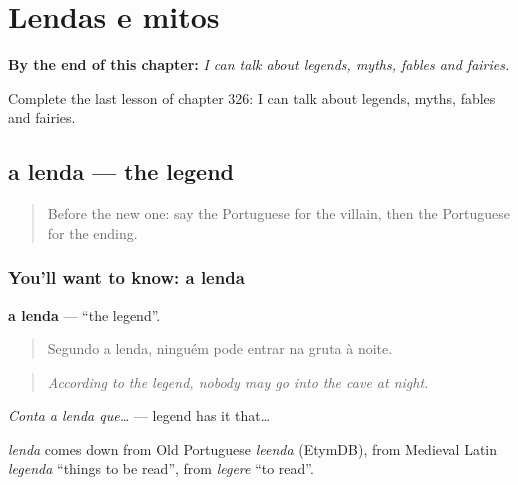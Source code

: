 
\chapter{Lendas e mitos}
\label{ch:pt-lendas-e-mitos}

\begin{chapteropening}
\textbf{By the end of this chapter:} \emph{I can talk about legends, myths, fables and fairies.}

Complete the last lesson of chapter 326: I can talk about legends, myths, fables and fairies.
\end{chapteropening}

\section[a lenda]{a lenda — the legend}

\label{lesson:PT-C326-lenda}



\begin{quote}
Before the new one: say the Portuguese for the villain, then the Portuguese for the ending.
\end{quote}

\subsection*{You'll want to know: a lenda}
\textbf{a lenda} — \textquotedblleft{}the legend\textquotedblright{}.

\begin{quote}
Segundo a lenda, ninguém pode entrar na gruta à noite.
\end{quote}

\begin{quote}
\emph{According to the legend, nobody may go into the cave at night.}
\end{quote}

\emph{Conta a lenda que…} — legend has it that…

\begin{cousinweb}
\emph{lenda} comes down from Old Portuguese \emph{leenda} (EtymDB), from Medieval Latin \emph{legenda} \textquotedblleft{}things to be read\textquotedblright{}, from \emph{legere} \textquotedblleft{}to read\textquotedblright{}.
\end{cousinweb}

